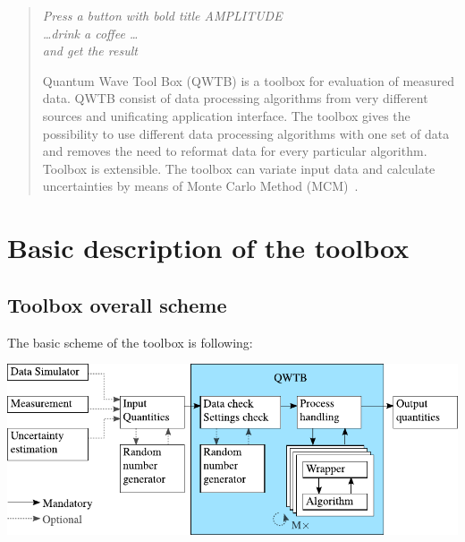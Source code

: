 \documentclass[12pt,a4paper,oneside]{report} %
\begin{document}
\tableofcontents

\begin{abstract} %
\bigskip
\begin{center}
        \parbox{0.7\textwidth}{\textit{Press a button with bold title AMPLITUDE\\
        \dots drink a coffee \dots\\
        and get the result}}
\end{center}

\bigskip
\noindent Quantum Wave Tool Box (QWTB) is a toolbox for evaluation of measured data. QWTB consist of data
processing algorithms from very different sources and unificating application interface. The toolbox
gives the possibility to use different data processing algorithms with one set of data and removes
the need to reformat data for every particular algorithm. Toolbox is extensible. The toolbox
can variate input data and calculate uncertainties by means of Monte Carlo Method
(MCM)~\cite{JCGM2008}.
\end{abstract}

\chapter{Basic description of the toolbox} %
\section{Toolbox overall scheme} %
The basic scheme of the toolbox is following:
\begin{center}
        \includegraphics{sources/basic scheme v2.pdf}
\end{center}
\end{document}
